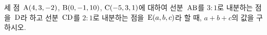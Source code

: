 세 점~$\mathrm{A}(4{,}\mkern3mu\mathopen{}3{,}\mkern3mu\mathopen{}-2)$, $\mathrm{B}(0{,}\mkern3mu\mathopen{}-1{,}\mkern3mu\mathopen{}10)$, $\mathrm{C}(-5{,}\mkern3mu\mathopen{}3{,}\mkern3mu\mathopen{}1)$에 대하여 선분~$\mathrm{AB}$를 $3:1$로 내분하는 점을~$\mathrm{D}$라 하고 선분~$\mathrm{CD}$를 $2:1$로 내분하는 점을~$\mathrm{E}(a{,}\mkern3mu\mathopen{}b{,}\mkern3mu\mathopen{}c)$라 할 때, $a+b+c$의 값을 구하시오.
